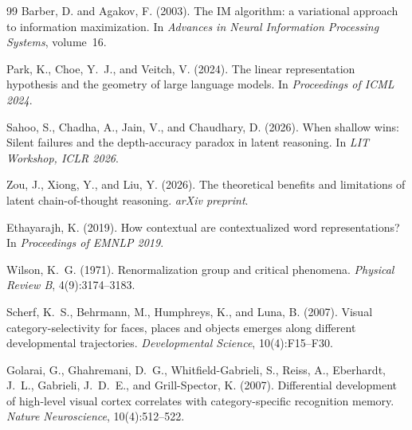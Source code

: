 \documentclass[11pt]{article}
\begin{document}
\begin{thebibliography}{99}
Barber, D. and Agakov, F. (2003).
The IM algorithm: a variational approach to information maximization.
In \textit{Advances in Neural Information Processing Systems}, volume~16.

Park, K., Choe, Y.~J., and Veitch, V. (2024).
The linear representation hypothesis and the geometry of large language models.
In \textit{Proceedings of ICML 2024}.

Sahoo, S., Chadha, A., Jain, V., and Chaudhary, D. (2026).
When shallow wins: Silent failures and the depth-accuracy paradox in latent reasoning.
In \textit{LIT Workshop, ICLR 2026}.

Zou, J., Xiong, Y., and Liu, Y. (2026).
The theoretical benefits and limitations of latent chain-of-thought reasoning.
\textit{arXiv preprint}.

Ethayarajh, K. (2019).
How contextual are contextualized word representations?
In \textit{Proceedings of EMNLP 2019}.

Wilson, K.~G. (1971).
Renormalization group and critical phenomena.
\textit{Physical Review B}, 4(9):3174--3183.

Scherf, K.~S., Behrmann, M., Humphreys, K., and Luna, B. (2007).
Visual category-selectivity for faces, places and objects emerges along different developmental
trajectories.
\textit{Developmental Science}, 10(4):F15--F30.

Golarai, G., Ghahremani, D.~G., Whitfield-Gabrieli, S., Reiss, A., Eberhardt, J.~L.,
Gabrieli, J.~D.~E., and Grill-Spector, K. (2007).
Differential development of high-level visual cortex correlates with category-specific
recognition memory.
\textit{Nature Neuroscience}, 10(4):512--522.

\end{thebibliography}
\end{document}
